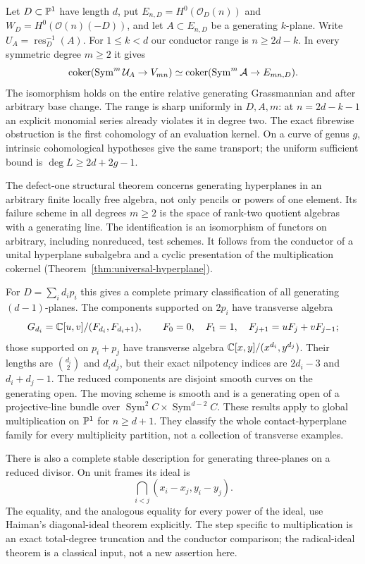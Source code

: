 Let $D\subset\mathbb P^1$ have length $d$, put
$E_{n,D}=H^0(\mathcal O_D(n))$ and $W_D=H^0(\mathcal O(n)(-D))$,
and let $A\subset E_{n,D}$ be a generating $k$-plane. Write
$U_A=\operatorname{res}_D^{-1}(A)$. For $1\le k<d$ our conductor
range is $n\ge2d-k$. In every symmetric degree $m\ge2$ it gives
\begin{equation}\label{eq:intro-conductor-cokernel}
 \operatorname{coker}(\operatorname{Sym}^m\mathcal U_A\to V_{mn})
 \simeq\operatorname{coker}(\operatorname{Sym}^m\mathcal A\to E_{mn,D}).
\end{equation}
The isomorphism holds on the entire relative generating Grassmannian
and after arbitrary base change. The range is sharp uniformly in
$D,A,m$: at $n=2d-k-1$ an explicit monomial series already violates
it in degree two. The exact fibrewise obstruction is the first
cohomology of an evaluation kernel. On a curve of genus $g$, intrinsic
cohomological hypotheses give the same transport; the uniform
sufficient bound is $\deg L\ge2d+2g-1$.

The defect-one structural theorem concerns generating hyperplanes in
an arbitrary finite locally free algebra, not only pencils or powers
of one element. Its failure scheme in all degrees $m\ge2$ is the
space of rank-two quotient algebras with a generating line. The
identification is an isomorphism of functors on arbitrary, including
nonreduced, test schemes. It follows from the conductor of a unital
hyperplane subalgebra and a cyclic presentation of the multiplication
cokernel (Theorem~\ref{thm:universal-hyperplane}).

For $D=\sum_i d_i p_i$ this gives a complete primary classification
of all generating $(d-1)$-planes. The components supported on $2p_i$
have transverse algebra
\[
 G_{d_i}=\mathbb C[u,v]/(F_{d_i},F_{d_i+1}),\qquad
 F_0=0,\quad F_1=1,\quad F_{j+1}=uF_j+vF_{j-1};
\]
those supported on $p_i+p_j$ have transverse algebra
$\mathbb C[x,y]/(x^{d_i},y^{d_j})$. Their lengths are $\binom{d_i}2$
and $d_id_j$, but their exact nilpotency indices are $2d_i-3$ and
$d_i+d_j-1$. The reduced components are disjoint smooth curves on
the generating open. The moving scheme is smooth and is a generating
open of a projective-line bundle over
$\operatorname{Sym}^2 C\times\operatorname{Sym}^{d-2} C$.
These results apply to global multiplication on $\mathbb P^1$ for $n\ge d+1$.
They classify the whole contact-hyperplane family for every
multiplicity partition, not a collection of transverse examples.

There is also a complete stable description for generating
three-planes on a reduced divisor. On unit frames its ideal is
\[
 \bigcap_{i<j}(x_i-x_j,y_i-y_j).
\]
The equality, and the analogous equality for every power of the
ideal, use Haiman's diagonal-ideal theorem explicitly. The step
specific to multiplication is an exact total-degree truncation and
the conductor comparison; the radical-ideal theorem is a classical
input, not a new assertion here.


